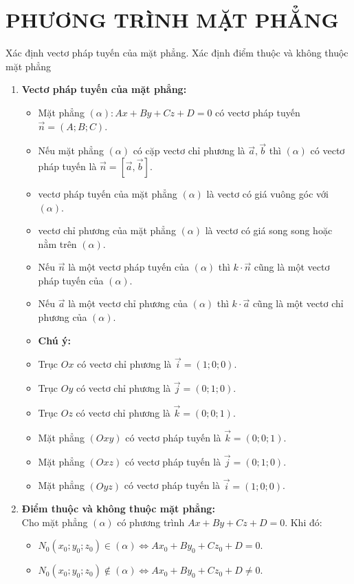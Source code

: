 \section{PHƯƠNG TRÌNH MẶT PHẲNG}
\begin{dang}{Xác định vectơ pháp tuyến của mặt phẳng. Xác định điểm thuộc và không thuộc mặt phẳng}
	\begin{enumerate}[label=\bf\arabic*.]
		\item \textbf{Vectơ pháp tuyến của mặt phẳng:}
		\begin{itemize}
			\item Mặt phẳng $(\alpha)\colon A x+B y+C z+D=0$ có vectơ pháp tuyến $\overrightarrow{n}=(A; B; C)$.
			\item Nếu mặt phẳng $(\alpha)$ có cặp vectơ chỉ phương là $\overrightarrow{a}, \overrightarrow{b}$ thì $(\alpha)$ có vectơ pháp tuyến là $\overrightarrow{n}=\left[\overrightarrow{a}, \overrightarrow{b}\right]$.
			\item vectơ pháp tuyến của mặt phẳng $(\alpha)$ là vectơ có giá vuông góc với $(\alpha)$.
			\item vectơ chỉ phương của mặt phẳng $(\alpha)$ là vectơ có giá song song hoặc nằm trên $(\alpha)$.
			\item Nếu $\overrightarrow{n}$ là một vectơ pháp tuyến của $(\alpha)$ thì $k \cdot \overrightarrow{n}$ cũng là một vectơ pháp tuyến của $(\alpha)$.
			\item Nếu $\overrightarrow{a}$ là một vectơ chỉ phương của $(\alpha)$ thì $k \cdot \overrightarrow{a}$ cũng là một vectơ chỉ phương của $(\alpha)$.
			\item[] \textbf{Chú ý:}
			\item Trục $O x$ có vectơ chỉ phương là $\overrightarrow{i}=(1; 0; 0)$.
			\item Trục $O y$ có vectơ chỉ phương là $\overrightarrow{j}=(0; 1; 0)$.
			\item Trục $O z$ có vectơ chỉ phương là $\overrightarrow{k}=(0; 0; 1)$.
			\item Mặt phẳng $(O x y)$ có vectơ pháp tuyến là $\overrightarrow{k}=(0; 0; 1)$.
			\item Mặt phẳng $(O x z)$ có vectơ pháp tuyến là $\overrightarrow{j}=(0; 1; 0)$.
			\item Mặt phẳng $(O y z)$ có vectơ pháp tuyến là $\overrightarrow{i}=(1; 0; 0)$.
		\end{itemize}
		\item \textbf{Điểm thuộc và không thuộc mặt phẳng:}\\
		Cho mặt phẳng $(\alpha)$ có phương trình $A x+B y+C z+D=0$. Khi đó: 
		\begin{itemize}
			\item $N_0\left(x_0; y_0; z_0\right) \in(\alpha) \Leftrightarrow A x_0+B y_0+C z_0+D=0$.
			\item $N_0\left(x_0; y_0; z_0\right) \notin(\alpha) \Leftrightarrow A x_0+B y_0+C z_0+D \neq 0$.	
		\end{itemize}
	\end{enumerate}
\end{dang}


